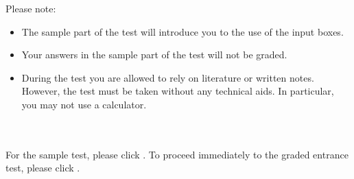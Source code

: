 



\Mtikzexternalize




\begin{MSectionStart}
\MGlobalSTestTag
{}

Please note:

\begin{itemize}
\item{The sample part of the test will introduce you to the use of the input boxes.}
\item{Your answers in the sample part of the test will not be graded.}
\item{During the test you are allowed to rely on literature or written notes. However, 
the test must be taken without any technical aids. In particular, you may not use a calculator.}
\end{itemize}

\ \\ \ \\
For the sample test, please click .
To proceed immediately to the graded entrance test, please click .

\end{MSectionStart}

